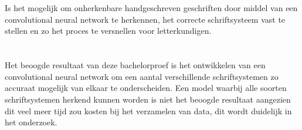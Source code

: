 \section{}
\label{sec:onderzoeksvraag}


Is het mogelijk om onherkenbare handgeschreven geschriften door middel van een convolutional neural network te herkennen, het correcte schriftsysteem vast te stellen en zo het proces te versnellen voor letterkundigen.


\section{}
\label{sec:onderzoeksdoelstelling}

Het beoogde resultaat van deze bachelorproef is het ontwikkelen van een convolutional neural network om een aantal verschillende schriftsystemen zo accuraat mogelijk van elkaar te onderscheiden.
Een model waarbij alle soorten schriftsystemen herkend kunnen worden is niet het beoogde resultaat aangezien dit veel meer tijd zou kosten bij het verzamelen van data, dit wordt duidelijk in het onderzoek.


\section{}
\label{sec:opzet-bachelorproef}


